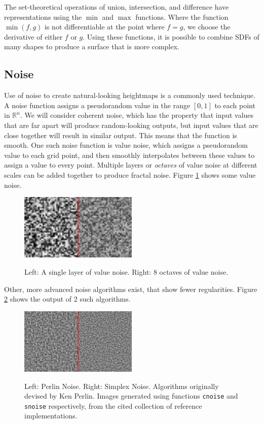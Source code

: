 \documentclass[11pt]{article}
\begin{document}
The set-theoretical operations of union, intersection, and difference have representations using the $\min$ and $\max$ functions. Where the function $\min\left(f,g\right)$ is not differentiable at the point where $f = g$, we choose the derivative of either $f$ or $g$. Using these functions, it is possible to combine SDFs of many shapes to produce a surface that is more complex.

\subsection{Noise}
\label{section:noise}
Use of noise to create natural-looking heightmaps is a commonly used technique. A noise function assigns a pseudorandom value in the range $\left[0,1\right]$ to each point in $\mathbb{R}^n$. We will consider coherent noise, which has the property that input values that are far apart will produce random-looking outputs, but input values that are close together will result in similar output. This means that the function is smooth. One such noise function is value noise, which assigns a pseudorandom value to each grid point, and then smoothly interpolates between these values to assign a value to every point. Multiple layers or \textit{octaves} of value noise at different scales can be added together to produce fractal noise. Figure \ref{fig:value_noise} shows some value noise.

\begin{figure}
  \caption{Left: A single layer of value noise. Right: 8 octaves of value noise.}
  \includegraphics[width=0.5\textwidth]{value_noise.png}
  \label{fig:value_noise}
\end{figure}

Other, more advanced noise algorithms exist, that show fewer regularities. Figure \ref{fig:better_noise} shows the output of 2 such algorithms.
\begin{figure}
  \caption{Left: Perlin Noise. Right: Simplex Noise. Algorithms originally devised by Ken Perlin\cite{PerlinChapter2N}. Images generated using functions \texttt{cnoise} and \texttt{snoise} respectively, from the cited collection of reference implementations\cite{github_2014}.}
  \includegraphics[width=0.5\textwidth]{better_noise.png}
  \label{fig:better_noise}
\end{figure}
\end{document}

